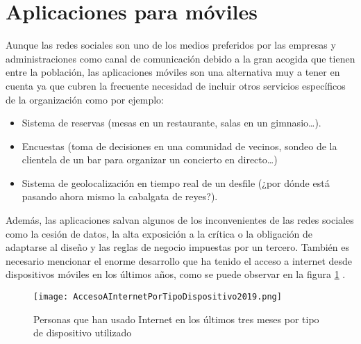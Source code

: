 \section{Aplicaciones para móviles}
Aunque las redes sociales son uno de los medios preferidos por las empresas \cite{linkedin} y administraciones \cite{grande2015casos} como canal de comunicación debido a la gran acogida que tienen entre la población, las aplicaciones móviles son una alternativa muy a tener en cuenta ya que cubren la frecuente necesidad de incluir otros servicios específicos de la organización como por ejemplo:
\begin{itemize}
    \item Sistema de reservas (mesas en un restaurante, salas en un gimnasio\dots).
    \item Encuestas (toma de decisiones en una comunidad de vecinos, sondeo de la clientela de un bar para organizar un concierto en directo\dots)
    \item Sistema de geolocalización en tiempo real de un desfile (¿por dónde está pasando ahora mismo la cabalgata de reyes?).
\end{itemize}
Además, las aplicaciones salvan algunos de los inconvenientes de las redes sociales como la cesión de datos, la alta exposición a la crítica o la obligación de adaptarse al diseño y las reglas de negocio impuestas por un tercero.
También es necesario mencionar el enorme desarrollo que ha tenido el acceso a internet desde dispositivos móviles en los últimos años, como se puede observar en la figura \ref{fig:acceso-internet-tipo-dispositivo} \cite{dispositivos_internet_2019}.

\begin{figure}[ht]
    \centering
    \texttt{[image: AccesoAInternetPorTipoDispositivo2019.png]}
    \caption{Personas que han usado Internet en los últimos tres meses por tipo de dispositivo utilizado }
    \label{fig:acceso-internet-tipo-dispositivo}
\end{figure}